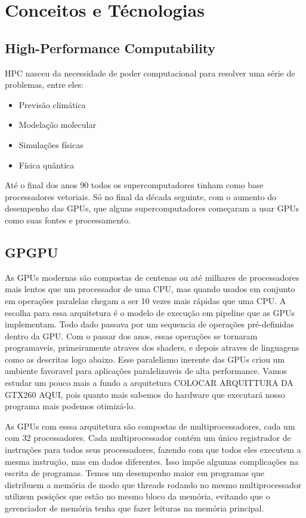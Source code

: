 \section{Conceitos e Técnologias}
\subsection{High-Performance Computability}
HPC nasceu da necessidade de poder computacional para resolver uma série de problemas, entre eles:
\begin{itemize}
  \item Previsão climática
  \item Modelação molecular
  \item Simulações físicas
  \item Física quântica
\end{itemize}
Até o final dos anos 90 todos os supercomputadores tinham como base processadores vetoriais. Só no final da década seguinte, 
com o aumento do desempenho das GPUs, que alguns supercomputadores começaram a usar GPUs como suas fontes e processamento.
\subsection{GPGPU}
As GPUs modernas são compostas de centenas ou até milhares de processadores mais lentos que um processador de uma CPU,
mas quando usados em conjunto em operações paralelas chegam a ser 10 vezes mais rápidas que uma CPU. A escolha para essa
arquitetura é o modelo de execução em pipeline que as GPUs implementam. Todo dado passava por um sequencia de operações
pré-definidas dentro da GPU. Com o passar dos anos, essas operações se tornaram programaveis, primeiramente atraves
dos shaders, e depois atraves de linguagens como as descritas logo abaixo. Esse paralelismo inerente das GPUs criou
um ambiente favoravel para aplicações paralelizaveis de alta performance. Vamos estudar um pouco mais a fundo a 
arquitetura COLOCAR ARQUITTURA DA GTX260 AQUI, pois quanto mais sabemos do hardware que executará nosso programa
mais podemos otimizá-lo.
 
As GPUs com esssa arquitetura são compostas de multiprocessadores, cada um com 32 processadores. Cada multiprocessador
contém um único registrador de instruções para todos seus processadores, fazendo com que todos eles executem a mesma 
instrução, mas em dados diferentes. Isso impõe algumas complicações na escrita de programas. Temos um desempenho
maior em programas que distribuem a memória de modo que threads rodando no mesmo multiprocessador utilizem posições
que estão no mesmo bloco da memória, evitando que o gerenciador de memória tenha que fazer leituras na memória principal.

